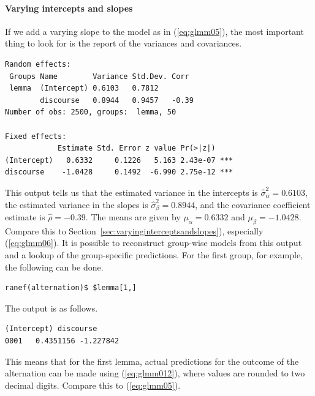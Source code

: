 \documentclass[a4paper,12pt]{article}
\begin{document}
\paragraph{Varying intercepts and slopes}

If we add a varying slope to the model as in (\ref{eq:glmm05}), the most important thing to look for is the report of the variances and covariances.

\vspace{0.5\baselineskip}

\begin{lstlisting}[frame=trbl]
Random effects:
 Groups Name        Variance Std.Dev. Corr 
 lemma  (Intercept) 0.6103   0.7812        
        discourse   0.8944   0.9457   -0.39
Number of obs: 2500, groups:  lemma, 50

Fixed effects:
            Estimate Std. Error z value Pr(>|z|)    
(Intercept)   0.6332     0.1226   5.163 2.43e-07 ***
discourse    -1.0428     0.1492  -6.990 2.75e-12 ***
\end{lstlisting}

This output tells us that the estimated variance in the intercepts is $\hat{\sigma}_{\alpha}^2=0.6103$, the estimated variance in the slopes is $\hat{\sigma}_{\beta}^2=0.8944$, and the covariance coefficient estimate is $\hat{\rho}=-0.39$.
The means are given by $\mu_{\alpha}=0.6332$ and $\mu_{\beta}=-1.0428$.
Compare this to Section~\ref{sec:varyinginterceptsandslopes}), especially (\ref{eq:glmm06}).
It is possible to reconstruct group-wise models from this output and a lookup of the group-specific predictions.
For the first group, for example, the following can be done.

\vspace{0.5\baselineskip}

\begin{lstlisting}[frame=trbl]
ranef(alternation)$ $lemma[1,]
\end{lstlisting}

The output is as follows.

\vspace{0.5\baselineskip}

\begin{lstlisting}[frame=trbl]
     (Intercept) discourse
0001   0.4351156 -1.227842
\end{lstlisting}

This means that for the first lemma, actual predictions for the outcome of the alternation can be made using (\ref{eq:glmm012}), where values are rounded to two decimal digits.
Compare this to (\ref{eq:glmm05}).
\end{document}
